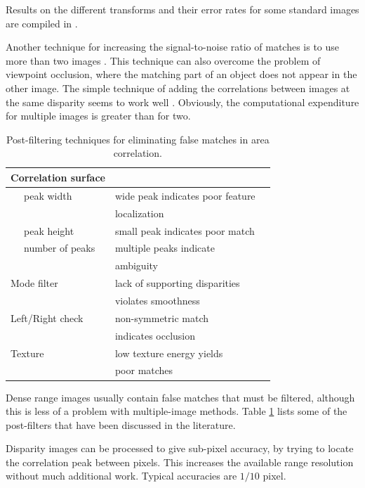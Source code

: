 \documentclass[twocolumn,oneside]{book}
\begin{document}
Results on the different transforms and their error rates for some
standard images are compiled in \cite{middlebury}.

Another technique for increasing the signal-to-noise ratio of matches
is to use more than two images \cite{faugeras96}.  This technique can
also overcome the problem of viewpoint occlusion, where the matching
part of an object does not appear in the other image.  The simple
technique of adding the correlations between images at the same
disparity seems to work well \cite{okutomi93}.  Obviously, the
computational expenditure for multiple images is greater than for
two. 

\begin{table}
\begin{tabular}{|p{1.2in}p{2in}|l|}
\hline
Correlation surface  & \cite{matthies93}\\
\hline
\verb+  + peak width & wide peak indicates poor feature\\
 & localization \\
\verb+  + peak height & small peak indicates poor match \\
\verb+  + number of peaks  & multiple peaks indicate\\
& ambiguity \\
\hline
Mode filter  & lack of supporting disparities \\
&violates smoothness \\	
\hline
Left/Right check  & non-symmetric match\\
\cite{bolles93,fua93}& indicates occlusion \\
\hline
Texture \cite{moravec79}  & low texture energy yields\\
&poor matches \\
\hline
\end{tabular}

\caption{
Post-filtering techniques for eliminating false matches in area
correlation. 
\label{tab23.post-filter}}


\end{table}

Dense range images usually contain false matches that must be
filtered, although this is less of a problem with multiple-image
methods.  Table \ref{tab23.post-filter} lists some of the post-filters
that have been discussed in the literature. 

Disparity images can be processed to give sub-pixel
accuracy, by trying to locate the correlation peak between pixels.
This increases the available range resolution without much additional
work.  Typical accuracies are $1/10$ pixel.
\end{document}

